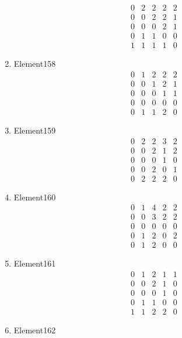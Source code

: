 \documentclass[12pt]{article}
\begin{document}
\begin{multicols}{3}
\begin{enumerate}
\begin{equation*}
\begin{array}{ccccc}
0&2&2&2&2\\
0&0&2&2&1\\
0&0&0&2&1\\
0&1&1&0&0\\
1&1&1&1&0
\end{array}
\end{equation*}
\item Element158
\begin{equation*}
\begin{array}{ccccc}
0&1&2&2&2\\
0&0&1&2&1\\
0&0&0&1&1\\
0&0&0&0&0\\
0&1&1&2&0
\end{array}
\end{equation*}
\item Element159
\begin{equation*}
\begin{array}{ccccc}
0&2&2&3&2\\
0&0&2&1&2\\
0&0&0&1&0\\
0&0&2&0&1\\
0&2&2&2&0
\end{array}
\end{equation*}
\item Element160
\begin{equation*}
\begin{array}{ccccc}
0&1&4&2&2\\
0&0&3&2&2\\
0&0&0&0&0\\
0&1&2&0&2\\
0&1&2&0&0
\end{array}
\end{equation*}
\item Element161
\begin{equation*}
\begin{array}{ccccc}
0&1&2&1&1\\
0&0&2&1&0\\
0&0&0&1&0\\
0&1&1&0&0\\
1&1&2&2&0
\end{array}
\end{equation*}
\item Element162
\begin{equation*}
\begin{array}{ccccc}

\end{array}
\end{equation*}
\end{enumerate}
\end{multicols}
\end{document}
